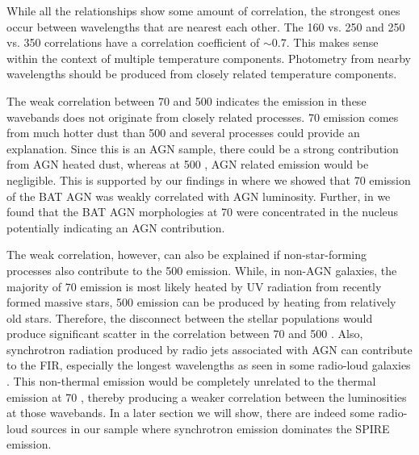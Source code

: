 While all the relationships show some amount of correlation, the strongest ones occur between wavelengths that are nearest each other. The 160 vs. 250 \um{} and 250 vs. 350 \um{} correlations have a correlation coefficient of $\sim0.7$. This makes sense within the context of multiple temperature components. Photometry from nearby wavelengths should be produced from closely related temperature components.

The weak correlation between 70 and 500 \um{} indicates the emission in these wavebands does not originate from closely related processes. 70 \um{} emission comes from much hotter dust than 500 \um{} and several processes could provide an explanation. Since this is an AGN sample, there could be a strong contribution from AGN heated dust, whereas at 500 \um{}, AGN related emission would be negligible. This is supported by our findings in \citet{Melendez:2014yu} where we showed that 70 \um{} emission of the BAT AGN was weakly correlated with AGN luminosity. Further, in \citep{Mushotzky:2014ad} we found that the BAT AGN morphologies at 70 \um{} were concentrated in the nucleus potentially indicating an AGN contribution.

The weak correlation, however, can also be explained if non-star-forming processes also contribute to the 500 \um{} emission. While, in non-AGN galaxies, the majority of 70 \um{} emission is most likely heated by UV radiation from recently formed massive stars, 500 \um{} emission can be produced by heating from relatively old stars. Therefore, the disconnect between the stellar populations would produce significant scatter in the correlation between 70 and 500 \um. Also, synchrotron radiation produced by radio jets associated with AGN can contribute to the FIR, especially the longest wavelengths as seen in some radio-loud galaxies \citep{Baes:2010ek,Boselli:2010fr}. This non-thermal emission would be completely unrelated to the thermal emission at 70 \um, thereby producing a weaker correlation between the luminosities at those wavebands. In a later section we will show, there are indeed some radio-loud sources in our sample where synchrotron emission dominates the SPIRE emission. 